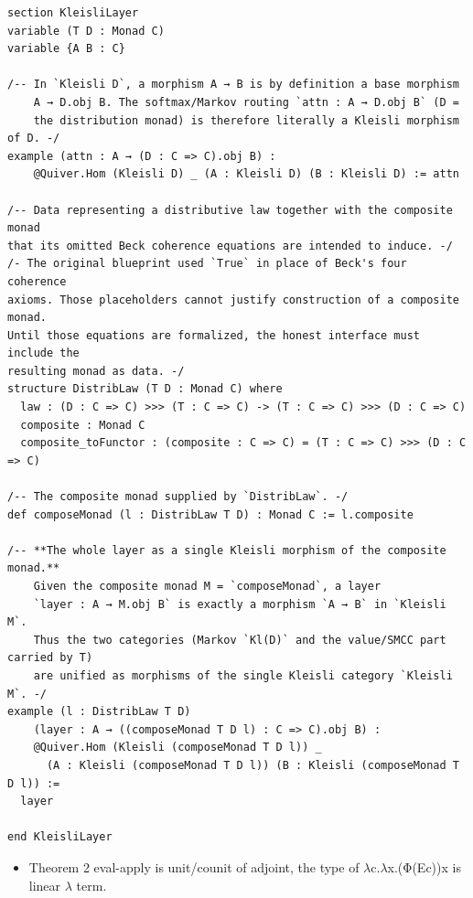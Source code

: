 \documentclass[a4paper,11pt]{article}
\begin{document}
\begin{lstlisting}
section KleisliLayer
variable (T D : Monad C)
variable {A B : C}

/-- In `Kleisli D`, a morphism A → B is by definition a base morphism
    A → D.obj B. The softmax/Markov routing `attn : A → D.obj B` (D = 
    the distribution monad) is therefore literally a Kleisli morphism of D. -/
example (attn : A → (D : C => C).obj B) :
    @Quiver.Hom (Kleisli D) _ (A : Kleisli D) (B : Kleisli D) := attn

/-- Data representing a distributive law together with the composite monad
that its omitted Beck coherence equations are intended to induce. -/
/- The original blueprint used `True` in place of Beck's four coherence
axioms. Those placeholders cannot justify construction of a composite monad.
Until those equations are formalized, the honest interface must include the
resulting monad as data. -/
structure DistribLaw (T D : Monad C) where
  law : (D : C => C) >>> (T : C => C) -> (T : C => C) >>> (D : C => C)
  composite : Monad C
  composite_toFunctor : (composite : C => C) = (T : C => C) >>> (D : C => C)

/-- The composite monad supplied by `DistribLaw`. -/
def composeMonad (l : DistribLaw T D) : Monad C := l.composite

/-- **The whole layer as a single Kleisli morphism of the composite monad.**
    Given the composite monad M = `composeMonad`, a layer
    `layer : A → M.obj B` is exactly a morphism `A → B` in `Kleisli M`.
    Thus the two categories (Markov `Kl(D)` and the value/SMCC part carried by T)
    are unified as morphisms of the single Kleisli category `Kleisli M`. -/
example (l : DistribLaw T D)
    (layer : A → ((composeMonad T D l) : C => C).obj B) :
    @Quiver.Hom (Kleisli (composeMonad T D l)) _
      (A : Kleisli (composeMonad T D l)) (B : Kleisli (composeMonad T D l)) :=
  layer

end KleisliLayer
\end{lstlisting}

\begin{itemize}
\item
  Theorem 2 eval-apply is unit/counit of adjoint, the type of
  \(\lambda\)c.\(\lambda\)x.(Φ(Ec))x is linear \(\lambda\) term.
\end{itemize}
\end{document}
